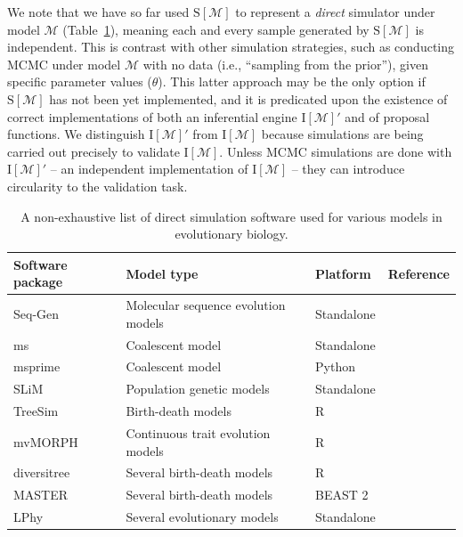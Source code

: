 \documentclass[oneside]{article}
\begin{document}
We note that we have so far used $\text{S}[\mathcal{M}]$ to represent a \emph{direct} simulator under model $\mathcal{M}$ (Table~\ref{tab:sim}), meaning each and every sample generated by $\text{S}[\mathcal{M}]$ is independent.
This is contrast with other simulation strategies, such as conducting MCMC under model $\mathcal{M}$ with no data (i.e., ``sampling from the prior''), given specific parameter values ($\theta$).
This latter approach may be the only option if $\text{S}[\mathcal{M}]$ has not been yet implemented, and it is predicated upon the existence of correct implementations of both an inferential engine $\text{I}[\mathcal{M}]'$ and of proposal functions.
We distinguish $\text{I}[\mathcal{M}]'$ from $\text{I}[\mathcal{M}]$ because simulations are being carried out precisely to validate $\text{I}[\mathcal{M}]$.
Unless MCMC simulations are done with $\text{I}[\mathcal{M}]'$ -- an independent implementation of $\text{I}[\mathcal{M}]$ -- they can introduce circularity to the validation task.

\begin{center}
  \begin{table}[h]
  \caption{A non-exhaustive list of direct simulation software used for various models in evolutionary biology.}
  \label{tab:sim}
  \centering
  \begin{tabular}{ p{0.7in} p{1.5in} p{1in} p{1.3in} }
    \hline
    Software package & Model type & Platform & Reference \\
    \hline  
    \rowcolor{gray!10}Seq-Gen & Molecular sequence evolution models & Standalone & \citealp{rambaut97} \\
    ms & Coalescent model & Standalone & \citealp{hudson02}\\
    \rowcolor{gray!10}msprime & Coalescent model & Python & \citealp{kelleher16}\\
    SLiM & Population genetic models & Standalone & \citealp{haller19}\\    
    \rowcolor{gray!10}TreeSim & Birth-death models & R & \citealp{stadler11}\\
    mvMORPH & Continuous trait evolution models & R & \citealp{clavel15}\\
    \rowcolor{gray!10}diversitree & Several birth-death models & R & \citealp{fitzjohn12}\\
    MASTER & Several birth-death models & BEAST 2 & \citealp{vaughan13}\\
    \rowcolor{gray!10}LPhy & Several evolutionary models & Standalone & \citealp{drummond23}\\ 
    \hline
  \end{tabular}
  \end{table}
\end{center}
\end{document}
